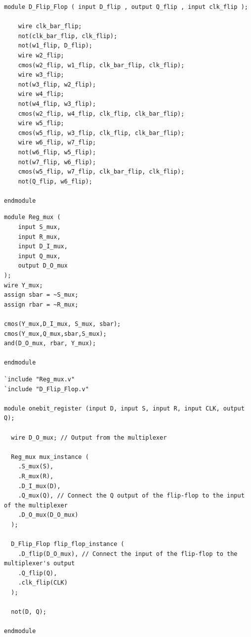 \begin{lstlisting}[style=verilogStyle, caption=D Flip-Flop in Verilog, label=verilog_dflipflop]
module D_Flip_Flop ( input D_flip , output Q_flip , input clk_flip );
	
	wire clk_bar_flip; 
	not(clk_bar_flip, clk_flip);
	not(w1_flip, D_flip);	  
	wire w2_flip;
	cmos(w2_flip, w1_flip, clk_bar_flip, clk_flip);	
	wire w3_flip;
	not(w3_flip, w2_flip); 
	wire w4_flip;
	not(w4_flip, w3_flip);
	cmos(w2_flip, w4_flip, clk_flip, clk_bar_flip);	 
	wire w5_flip;
	cmos(w5_flip, w3_flip, clk_flip, clk_bar_flip);
	wire w6_flip, w7_flip;
	not(w6_flip, w5_flip);
	not(w7_flip, w6_flip);
	cmos(w5_flip, w7_flip, clk_bar_flip, clk_flip);	 
	not(Q_flip, w6_flip);

endmodule
\end{lstlisting}

\begin{lstlisting}[style=verilogStyle, caption=Set/Reset-Circuit in Verilog, label=verilog_regmux]
module Reg_mux (
    input S_mux,
    input R_mux,
    input D_I_mux,
    input Q_mux,
    output D_O_mux
);			  
wire Y_mux;	
assign sbar = ~S_mux;
assign rbar = ~R_mux;  

cmos(Y_mux,D_I_mux, S_mux, sbar);
cmos(Y_mux,Q_mux,sbar,S_mux);
and(D_O_mux, rbar, Y_mux);

endmodule  
\end{lstlisting}

\begin{lstlisting}[style=verilogStyle, caption=1-bit Register in Verilog, label=verilog_1bitregister]
`include "Reg_mux.v"
`include "D_Flip_Flop.v"

module onebit_register (input D, input S, input R, input CLK, output Q);

  wire D_O_mux; // Output from the multiplexer 

  Reg_mux mux_instance (
    .S_mux(S),
    .R_mux(R),
    .D_I_mux(D), 
    .Q_mux(Q), // Connect the Q output of the flip-flop to the input of the multiplexer  
    .D_O_mux(D_O_mux)
  );

  D_Flip_Flop flip_flop_instance (
    .D_flip(D_O_mux), // Connect the input of the flip-flop to the multiplexer's output
    .Q_flip(Q),
    .clk_flip(CLK)
  );  
  
  not(D, Q);

endmodule
\end{lstlisting}

